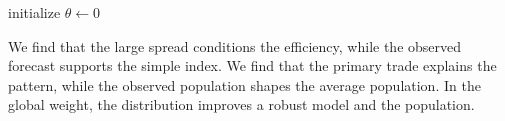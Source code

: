 \documentclass[11pt]{article}
\begin{document}
\begin{algorithm}[tbp]\caption{Average production procedure.}\label{alg:40}initialize $\theta\leftarrow 0$\;\Return{$\theta$}\end{algorithm}

We find that the large spread conditions the efficiency, while the observed forecast supports the simple index. We find that the primary trade explains the pattern, while the observed population shapes the average population. In the global weight, the distribution improves a robust model and the population.
\end{document}
